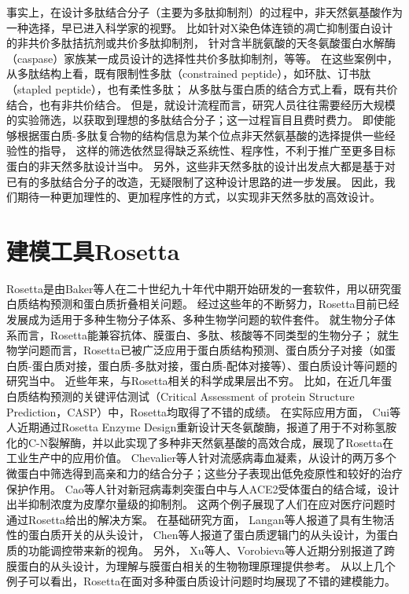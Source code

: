 事实上，在设计多肽结合分子（主要为多肽抑制剂）的过程中，非天然氨基酸作为一种选择，早已进入科学家的视野。
比如针对X染色体连锁的凋亡抑制蛋白设计的非共价多肽拮抗剂\cite{RN91,RN92,RN93}或共价多肽抑制剂\cite{RN94}，
针对含半胱氨酸的天冬氨酸蛋白水解酶（caspase）家族某一成员设计的选择性共价多肽抑制剂\cite{RN95,RN96}，等等。
在这些案例中，
从多肽结构上看，既有限制性多肽（constrained peptide），如环肽、订书肽（stapled peptide），也有柔性多肽；
从多肽与蛋白质的结合方式上看，既有共价结合，也有非共价结合。
但是，就设计流程而言，研究人员往往需要经历大规模的实验筛选，以获取到理想的多肽结合分子；这一过程盲目且费时费力。
即使能够根据蛋白质-多肽复合物的结构信息为某个位点非天然氨基酸的选择提供一些经验性的指导，
这样的筛选依然显得缺乏系统性、程序性，不利于推广至更多目标蛋白的非天然多肽设计当中。
另外，这些非天然多肽的设计出发点大都是基于对已有的多肽结合分子的改造，无疑限制了这种设计思路的进一步发展。
因此，我们期待一种更加理性的、更加程序性的方式，以实现非天然多肽的高效设计。



\section{建模工具Rosetta}

Rosetta是由Baker等人在二十世纪九十年代中期开始研发的一套软件，用以研究蛋白质结构预测和蛋白质折叠相关问题。
经过这些年的不断努力，Rosetta目前已经发展成为适用于多种生物分子体系、多种生物学问题的软件套件。
就生物分子体系而言，Rosetta能兼容抗体、膜蛋白、多肽、核酸等不同类型的生物分子；
就生物学问题而言，Rosetta已被广泛应用于蛋白质结构预测、蛋白质分子对接（如蛋白质-蛋白质对接，蛋白质-多肽对接，蛋白质-配体对接等）、蛋白质设计等问题的研究当中\cite{RN97}。
近些年来，与Rosetta相关的科学成果层出不穷。
比如，在近几年蛋白质结构预测的关键评估测试（Critical Assessment of protein Structure Prediction，CASP）中，Rosetta均取得了不错的成绩\cite{RN98}。
在实际应用方面，
Cui等人\cite{RN99}近期通过Rosetta Enzyme Design重新设计天冬氨酸酶，报道了用于不对称氢胺化的C-N裂解酶，并以此实现了多种非天然氨基酸的高效合成，展现了Rosetta在工业生产中的应用价值。
Chevalier等人\cite{RN100}针对流感病毒血凝素，从设计的两万多个微蛋白中筛选得到高亲和力的结合分子；这些分子表现出低免疫原性和较好的治疗保护作用。
Cao等人\cite{RN101}针对新冠病毒刺突蛋白中与人ACE2受体蛋白的结合域，设计出半抑制浓度为皮摩尔量级的抑制剂。
这两个例子展现了人们在应对医疗问题时通过Rosetta给出的解决方案。
在基础研究方面，
Langan等人\cite{RN3}报道了具有生物活性的蛋白质开关的从头设计，
Chen等人\cite{RN10}报道了蛋白质逻辑门的从头设计，为蛋白质的功能调控带来新的视角。
另外， Xu等人\cite{RN102}、Vorobieva等人\cite{RN103}近期分别报道了跨膜蛋白的从头设计，为理解与膜蛋白相关的生物物理原理提供参考。
从以上几个例子可以看出，Rosetta在面对多种蛋白质设计问题时均展现了不错的建模能力。

